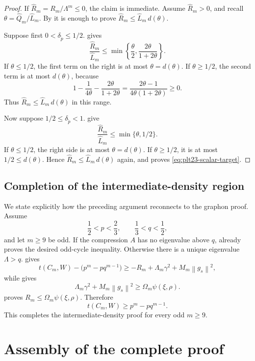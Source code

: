 ﻿\documentclass[11pt]{article}
\numberwithin{equation}{section}
\newcommand{\norm}[1]{\left\lVert #1\right\rVert}
\begin{document}
\begin{proof}
  If $\widehat R_m=R_m/\Lambda^m\le0$, the claim is immediate.
  Assume $\widehat R_m>0$, and recall $\theta=\widehat Q_m/\widehat L_m$.
  By  it is enough to prove $\widehat R_m\le\widehat L_m\,d(\theta)$.

  Suppose first $0<\delta_{\tilde p}\le1/2$.
   gives
  \[
    \frac{\widehat R_m}{\widehat L_m}
    \le
    \min\left\{
      \frac\theta2,
      \frac{2\theta}{1+2\theta}
    \right\}.
  \]
  If $\theta\le1/2$, the first term on the right is at most $\theta=d(\theta)$.
  If $\theta\ge1/2$, the second term is at most $d(\theta)$, because
  \[
    1-\frac1{4\theta}-\frac{2\theta}{1+2\theta}
    =\frac{2\theta-1}{4\theta(1+2\theta)}\ge0.
  \]
  Thus $\widehat R_m\le\widehat L_m\,d(\theta)$ in this range.

  Now suppose $1/2\le\delta_{\tilde p}<1$.
   give
  \[
    \frac{\widehat R_m}{\widehat L_m}
    \le\min\{\theta,1/2\}.
  \]
  If $\theta\le1/2$, the right side is at most $\theta=d(\theta)$.
  If $\theta\ge1/2$, it is at most $1/2\le d(\theta)$.
  Hence $\widehat R_m\le\widehat L_m\,d(\theta)$ again, and  proves \eqref{eq:plt23-scalar-target}.
\end{proof}

\subsection{Completion of the intermediate-density region}

We state explicitly how the preceding argument reconnects to the graphon proof.
Assume
\[
  \frac12<p<\frac23,
  \qquad
  \frac13<q<\frac12,
\]
and let $m\ge9$ be odd.
If the compression $A$ has no eigenvalue above $q$,  already proves the desired odd-cycle inequality.
Otherwise there is a unique eigenvalue $\Lambda>q$.
 gives
\[
  t(C_m,W)-\bigl(p^m-pq^{m-1}\bigr)
  \ge -R_m+\Lambda_m\gamma^2+M_m\norm{g_s}^2,
\]
while  gives
\[
  \Lambda_m\gamma^2+M_m\norm{g_s}^2
  \ge\Omega_m\psi(\xi,\rho).
\]
 proves $R_m\le\Omega_m\psi(\xi,\rho)$.
Therefore
\[
  t(C_m,W)\ge p^m-pq^{m-1}.
\]
This completes the intermediate-density proof for every odd $m\ge9$.


\section{Assembly of the complete proof}\label{sec:assembly}
\end{document}
